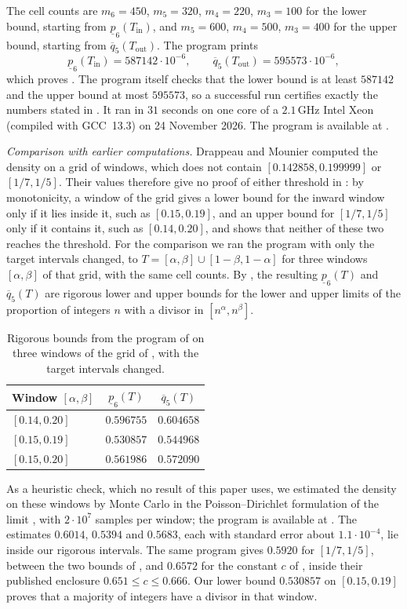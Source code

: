 \documentclass[11pt,colorlinks]{charlie}
\newcommand{\Tin}{T_{\mathrm{in}}}
\newcommand{\Tout}{T_{\mathrm{out}}}
\begin{document}
The cell counts are $m_6=450$, $m_5=320$, $m_4=220$, $m_3=100$ for the lower bound, starting from $\underline p_6(\Tin)$, and $m_5=600$, $m_4=500$, $m_3=400$ for the upper bound, starting from $\overline q_5(\Tout)$. The program prints
\[
 \underline p_6(\Tin)=587142\cdot10^{-6},\qquad\overline q_5(\Tout)=595573\cdot10^{-6},
\]
which proves . The program itself checks that the lower bound is at least $587142$ and the upper bound at most $595573$, so a successful run certifies exactly the numbers stated in . It ran in $31$ seconds on one core of a $2.1$\,GHz Intel Xeon (compiled with GCC~13.3) on 24 November 2026. The program is available at \coderepo.

\emph{Comparison with earlier computations.} Drappeau and Mounier \cite{DM} computed the density on a grid of windows, which does not contain $[0.142858,0.199999]$ or $[1/7,1/5]$. Their values therefore give no proof of either threshold in : by monotonicity, a window of the grid gives a lower bound for the inward window only if it lies inside it, such as $[0.15,0.19]$, and an upper bound for $[1/7,1/5]$ only if it contains it, such as $[0.14,0.20]$, and  shows that neither of these two reaches the threshold. For the comparison we ran the program with only the target intervals changed, to $T=[\alpha,\beta]\cup[1-\beta,1-\alpha]$ for three windows $[\alpha,\beta]$ of that grid, with the same cell counts. By , the resulting $\underline p_6(T)$ and $\overline q_5(T)$ are rigorous lower and upper bounds for the lower and upper limits of the proportion of integers $n$ with a divisor in $[n^\alpha,n^\beta]$.
\begin{table}[ht]
\centering\small
\begin{tabular}{@{}lcc@{}}
\toprule
Window $[\alpha,\beta]$ & $\underline p_6(T)$ & $\overline q_5(T)$ \\
\midrule
$[0.14,0.20]$ & $0.596755$ & $0.604658$ \\
$[0.15,0.19]$ & $0.530857$ & $0.544968$ \\
$[0.15,0.20]$ & $0.561986$ & $0.572090$ \\
\bottomrule
\end{tabular}
\caption{Rigorous bounds from the program of  on three windows of the grid of \cite{DM}, with the target intervals changed.}\label{tab:DM}
\end{table}
As a heuristic check, which no result of this paper uses, we estimated the density on these windows by Monte Carlo in the Poisson--Dirichlet formulation of the limit \cite{Haddad}, with $2\cdot10^7$ samples per window; the program is available at \coderepo. The estimates $0.6014$, $0.5394$ and $0.5683$, each with standard error about $1.1\cdot10^{-4}$, lie inside our rigorous intervals. The same program gives $0.5920$ for $[1/7,1/5]$, between the two bounds of , and $0.6572$ for the constant $c$ of \cite[Corollary~1.3]{DM}, inside their published enclosure $0.651\le c\le0.666$. Our lower bound $0.530857$ on $[0.15,0.19]$ proves that a majority of integers have a divisor in that window.
\end{document}
